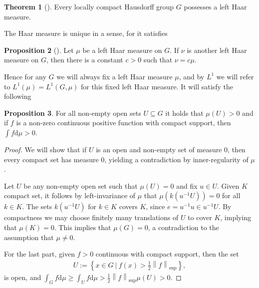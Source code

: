 \documentclass[10pt,twoside,openany,final]{memoir}
\theoremstyle{definition}
\newtheorem{theorem}{Theorem}[chapter]
\newtheorem{proposition}[theorem]{Proposition}
\theoremstyle{Break}
\newcommand{\lv}{\left\lVert}
\newcommand{\rv}{\right\rVert}
\renewcommand{\d}{\mathrm{d}}
\begin{document}
\begin{theorem}[\mbox{\cite[344]{folland2013real}}]
	Every locally compact Hausdorff group $G$ possesses a left Haar measure.
\end{theorem}
The Haar measure is unique in a sense, for it satisfies
\begin{proposition}[\cite{folland2013real}]
	Let $\mu$ be a left Haar measure on $G$. If $\nu$ is another left Haar measure on $G$, then there is a constant $c > 0$ such that $\nu=c \mu$.
\end{proposition}
Hence for any $G$  we will always fix a left Haar measure $\mu$, and by $L^1$ we will refer to $L^1(\mu)=L^1(G,\mu)$ for this fixed left Haar measure. It will satisfy the following
\begin{proposition}
	For all non-empty open sets $U \subseteq G$ it holds that $\mu(U)>0$ and if $f$ is a non-zero continuous positive function with compact support, then $\int f \d \mu>0$.
\end{proposition}
\begin{proof}
	We will show that if $U$ is an open and non-empty set of measure $0$, then every compact set has measure $0$, yielding a contradiction by inner-regularity of $\mu$.

	Let $U$ be any non-empty open set such that $\mu(U)=0$ and fix $u \in U$. Given $K$ compact set, it follows by left-invariance of $\mu$ that $\mu(k(u^{-1}U))=0$ for all $k \in K$. The sets $k(u^{-1}U)$ for $k \in K$ covers $K$, since $e =u^{-1}u \in u^{-1}U$. By compactness we may choose finitely many translations of $U$ to cover $K$, implying that $\mu(K)=0$. This implies that $\mu(G)=0$, a contradiction to the assumption that $\mu \neq 0$.

For the last part, given $f>0$ continuous with compact support, then the set 
	\begin{align*}
		U:=\left\{ x \in G \ | \ f(x) > \frac{1}{2}\lv f \rv_{\sup} \right\},
	\end{align*}
is open, and $\int_G f \d \mu \geq \int_U f \d \mu > \frac{1}{2}\lv f \rv_{\sup} \mu(U)>0$. 
\end{proof}
\end{document}
